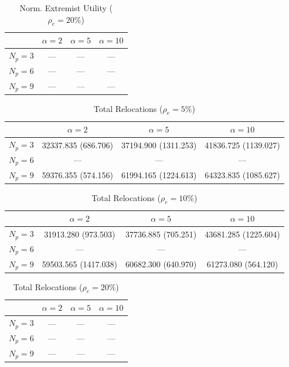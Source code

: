 \begin{table}[htbp]
\centering
\begin{tabular}{lccc}
\toprule
 & $\alpha=2$ & $\alpha=5$ & $\alpha=10$ \\
\midrule
$N_p=3$ & --- & --- & --- \\
$N_p=6$ & --- & --- & --- \\
$N_p=9$ & --- & --- & --- \\
\bottomrule
\end{tabular}
\caption{Norm. Extremist Utility ($\rho_e=20\%$)}
\label{tab:exp2_norm_utility_extremist_rho20}
\end{table}


\begin{table}[htbp]
\centering
\begin{tabular}{lccc}
\toprule
 & $\alpha=2$ & $\alpha=5$ & $\alpha=10$ \\
\midrule
$N_p=3$ & 32337.835 (686.706) & 37194.900 (1311.253) & 41836.725 (1139.027) \\
$N_p=6$ & --- & --- & --- \\
$N_p=9$ & 59376.355 (574.156) & 61994.165 (1224.613) & 64323.835 (1085.627) \\
\bottomrule
\end{tabular}
\caption{Total Relocations ($\rho_e=5\%$)}
\label{tab:exp2_total_relocations_rho5}
\end{table}


\begin{table}[htbp]
\centering
\begin{tabular}{lccc}
\toprule
 & $\alpha=2$ & $\alpha=5$ & $\alpha=10$ \\
\midrule
$N_p=3$ & 31913.280 (973.503) & 37736.885 (705.251) & 43681.285 (1225.604) \\
$N_p=6$ & --- & --- & --- \\
$N_p=9$ & 59503.565 (1417.038) & 60682.300 (640.970) & 61273.080 (564.120) \\
\bottomrule
\end{tabular}
\caption{Total Relocations ($\rho_e=10\%$)}
\label{tab:exp2_total_relocations_rho10}
\end{table}


\begin{table}[htbp]
\centering
\begin{tabular}{lccc}
\toprule
 & $\alpha=2$ & $\alpha=5$ & $\alpha=10$ \\
\midrule
$N_p=3$ & --- & --- & --- \\
$N_p=6$ & --- & --- & --- \\
$N_p=9$ & --- & --- & --- \\
\bottomrule
\end{tabular}
\caption{Total Relocations ($\rho_e=20\%$)}
\label{tab:exp2_total_relocations_rho20}
\end{table}


